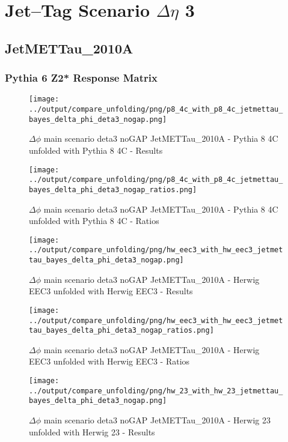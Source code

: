 \documentclass[11pt]{book}
\begin{document}
\newpage
\chapter{Jet--Tag Scenario $\Delta\eta$ 3}
\section{JetMETTau\_2010A}
\subsection{Pythia 6 Z2* Response Matrix}



\begin{figure}[ht]
\centering
\texttt{[image: ../output/compare\_unfolding/png/p8\_4c\_with\_p8\_4c\_jetmettau\_bayes\_delta\_phi\_deta3\_nogap.png]}
\caption{$\Delta\phi$ main scenario deta3 noGAP JetMETTau\_2010A - Pythia 8 4C unfolded with Pythia 8 4C - Results}
\label{p8_p8_jetmettau_bayes_delta_phi_deta3_nogap_a}
\end{figure}

\begin{figure}[ht]
\centering
\texttt{[image: ../output/compare\_unfolding/png/p8\_4c\_with\_p8\_4c\_jetmettau\_bayes\_delta\_phi\_deta3\_nogap\_ratios.png]}
\caption{$\Delta\phi$ main scenario deta3 noGAP JetMETTau\_2010A - Pythia 8 4C unfolded with Pythia 8 4C - Ratios}
\label{p8_p8_jetmettau_bayes_delta_phi_deta3_nogap_b}
\end{figure}

\begin{figure}[ht]
\centering
\texttt{[image: ../output/compare\_unfolding/png/hw\_eec3\_with\_hw\_eec3\_jetmettau\_bayes\_delta\_phi\_deta3\_nogap.png]}
\caption{$\Delta\phi$ main scenario deta3 noGAP JetMETTau\_2010A - Herwig EEC3 unfolded with Herwig EEC3 - Results}
\label{hw_eec3_hw_eec3_jetmettau_bayes_delta_phi_deta3_nogap_a}
\end{figure}

\begin{figure}[ht]
\centering
\texttt{[image: ../output/compare\_unfolding/png/hw\_eec3\_with\_hw\_eec3\_jetmettau\_bayes\_delta\_phi\_deta3\_nogap\_ratios.png]}
\caption{$\Delta\phi$ main scenario deta3 noGAP JetMETTau\_2010A - Herwig EEC3 unfolded with Herwig EEC3 - Ratios}
\label{hw_eec3_hw_eec3_jetmettau_bayes_delta_phi_deta3_nogap_b}
\end{figure}

\begin{figure}[ht]
\centering
\texttt{[image: ../output/compare\_unfolding/png/hw\_23\_with\_hw\_23\_jetmettau\_bayes\_delta\_phi\_deta3\_nogap.png]}
\caption{$\Delta\phi$ main scenario deta3 noGAP JetMETTau\_2010A - Herwig 23 unfolded with Herwig 23 - Results}
\label{hw_23_hw_23_jetmettau_bayes_delta_phi_deta3_nogap_a}
\end{figure}
\end{document}
